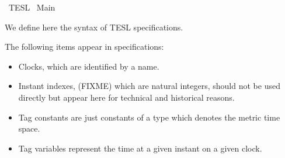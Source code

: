 %
\begin{isabellebody}%
%
%
\isadelimdocument
%
\endisadelimdocument
%
\isatagdocument
%
\isamarkuptrue%
%
\endisatagdocument
{\isafolddocument}%
%
\isadelimdocument
%
\endisadelimdocument
%
\isadelimtheory
%
\endisadelimtheory
%
\isatagtheory
{}\isamarkupfalse%
\ TESL\isanewline
{}\ Main\isanewline
\isanewline
{}%
\endisatagtheory
{\isafoldtheory}%
%
\isadelimtheory
%
\endisadelimtheory
%
\isadelimdocument
%
\endisadelimdocument
%
\isatagdocument
%
\isamarkuptrue%
%
\endisatagdocument
{\isafolddocument}%
%
\isadelimdocument
%
\endisadelimdocument
%
\begin{isamarkuptext}%
We define here the syntax of TESL specifications.%
\end{isamarkuptext}\isamarkuptrue%
%
\isadelimdocument
%
\endisadelimdocument
%
\isatagdocument
%
\isamarkuptrue%
%
\endisatagdocument
{\isafolddocument}%
%
\isadelimdocument
%
\endisadelimdocument
%
\begin{isamarkuptext}%
The following items appear in specifications:

%
\begin{itemize}%
\item Clocks, which are identified by a name.

\item Instant indexes, (FIXME) which are natural integers, should not be used directly but appear 
here for technical and historical reasons.

\item Tag constants are just constants of a type which denotes the metric time space.

\item Tag variables represent the time at a given instant on a given clock.


\end{itemize}
\end{isamarkuptext}
\end{isabellebody}

